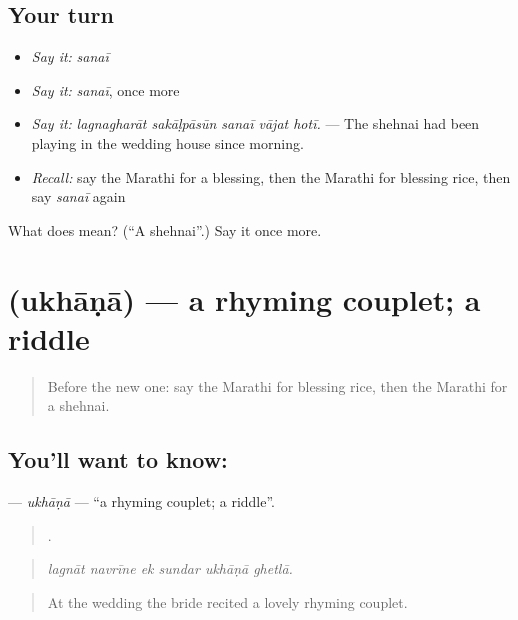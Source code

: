 \subsection*{Your turn}
\begin{itemize}
\raggedright
  \item \emph{Say it:} \emph{sanaī}
  \item \emph{Say it:} \emph{sanaī}, once more
  \item \emph{Say it:} \emph{lagnagharāt sakāḷpāsūn sanaī vājat hotī.} — The shehnai had been playing in the wedding house since morning.
  \item \emph{Recall:} say the Marathi for a blessing, then the Marathi for blessing rice, then say \emph{sanaī} again
\end{itemize}

\begin{tcolorbox}[breakable,colback=teal!4,colframe=teal!35!black,title={Before you move on}]
What does  mean? (\textquotedblleft{}A shehnai\textquotedblright{}.) Say it once more.
\end{tcolorbox}
\section[\texorpdfstring{\mr{उखाणा} (ukhāṇā)}{उखाणा (ukhāṇā)}]{ (ukhāṇā) — a rhyming couplet; a riddle}

\label{lesson:MR-C317-ukhana}



\begin{quote}
Before the new one: say the Marathi for blessing rice, then the Marathi for a shehnai.
\end{quote}

\subsection*{You'll want to know: }
\textbf{} — \emph{ukhāṇā} — \textquotedblleft{}a rhyming couplet; a riddle\textquotedblright{}.

\begin{quote}
     .
\end{quote}

\begin{quote}
\emph{lagnāt navrīne ek sundar ukhāṇā ghetlā.}
\end{quote}

\begin{quote}
At the wedding the bride recited a lovely rhyming couplet.
\end{quote}

